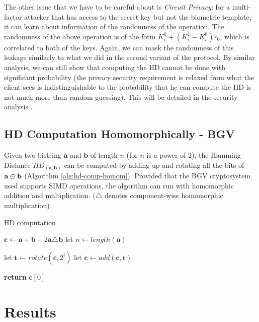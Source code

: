 The other issue that we have to be careful about is \textit{Circuit Privacy}:
for a multi-factor attacker that has access to the secret key but not the
biometric template, it can learn about information of the randomness of the
operation. The randomness of the above operation is of the form
\(K_{i}^{0} + (K_{i}^{1} - K_{i}^{0})r_{0}\), which is correlated to both of the
keys. Again, we can mask the randomness of this leakage similarly to what we did
in the second variant of the protocol. By similar analysis, we can still show
that computing the HD cannot be done with significant probability (the privacy
security requirement is relaxed from what the client sees is indistinguishable
to the probability that he can compute the HD is not much more than random
guessing). This will be detailed in the security analysis \missref{}.






\subsection{HD Computation Homomorphically - BGV}
Given two bistring \(\mathbf{a}\) and \(\mathbf{b}\) of length \(n\) (for \(n\)
is a power of 2), the Hamming Distance \(HD_{(\mathbf{a,b})}\) can be computed
by adding up and rotating all the bits of \(\mathbf{a} \oplus \mathbf{b}\)
(Algorithm \ref{alg:hd-comp-homom}). Provided that the BGV cryptosystem used
supports SIMD operations, the algorithm can run with homomorphic addition and
multiplication. ($\triangle$ denotes component-wise homomorphic multiplication)

\begin{algorithm}
\caption{HD computation}\label{alg:hd-comp-homom}
\begin{algorithmic}[1]
  \State $\mathbf{c} \gets \mathbf{a} + \mathbf{b} - 2 \mathbf{a} \triangle \mathbf{b}$
  \State let $n \gets length(\mathbf{a})$
  
  \State let $\mathbf{t} \gets rotate(\mathbf{c}, 2^{i})$
  \State let $\mathbf{c} \gets add(\mathbf{c}, \mathbf{t})$

  \EndFor
  
\State \textbf{return} $\mathbf{c}[0]$
\EndProcedure
\end{algorithmic}
\end{algorithm}

\section{Results}
\label{sec:6results}


